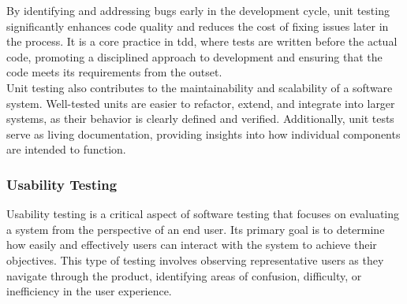 By identifying and addressing bugs early in the development cycle, unit testing significantly enhances code quality and reduces the cost of fixing issues later in the process. It is a core practice in \gls{tdd}, where tests are written before the actual code, promoting a disciplined approach to development and ensuring that the code meets its requirements from the outset. \cite{geeksforgeeks:unit-test} \\

Unit testing also contributes to the maintainability and scalability of a software system. Well-tested units are easier to refactor, extend, and integrate into larger systems, as their behavior is clearly defined and verified. Additionally, unit tests serve as living documentation, providing insights into how individual components are intended to function.

\subsubsection*{Usability Testing}




Usability testing is a critical aspect of software testing that focuses on evaluating a system from the perspective of an end user. Its primary goal is to determine how easily and effectively users can interact with the system to achieve their objectives. This type of testing involves observing representative users as they navigate through the product, identifying areas of confusion, difficulty, or inefficiency in the user experience. \cite{geeksforgeeks:user-test} \\

